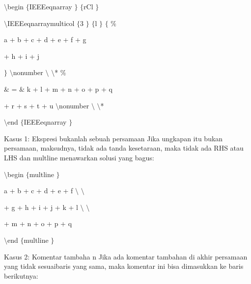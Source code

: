 \begin{itemize}
\vspace{12pt}
\noindent 
 $  \setminus  $begin $  \{  $IEEEeqnarray $  \}  $ $  \{  $rCl $  \}  $ \par
\vspace{12pt}
\noindent 
 $  \setminus  $IEEEeqnarraymulticol $  \{  $3 $  \}  $ $  \{  $l $  \}  $ $  \{  $ $  \%  $ \par
\vspace{12pt}
\noindent 
a + b + c + d + e + f + g \par
\vspace{12pt}
\noindent 
+ h + i + j \par
\vspace{12pt}
\noindent 
 $  \}  $ $  \setminus  $nonumber $  \setminus  $ $  \setminus  $* $  \%  $ \par
\vspace{12pt}
\noindent 
 $  \&  $ =  $  \&  $ k + l + m + n + o + p + q \par
\vspace{12pt}
\noindent 
+ r + s + t + u  $  \setminus  $nonumber $  \setminus  $ $  \setminus  $* \par
\vspace{12pt}
\noindent 
 $  \setminus  $end $  \{  $IEEEeqnarray $  \}  $ \par
\vspace{12pt}
\vspace{12pt}
\noindent 
Kasus 1: Ekspresi bukanlah sebuah persamaan Jika ungkapan itu bukan persamaan, maksudnya, tidak ada tanda kesetaraan, maka tidak ada RHS atau LHS dan multline menawarkan solusi yang bagus: \par
\vspace{12pt}
\noindent 
 $  \setminus  $begin $  \{  $multline $  \}  $ \par
\vspace{12pt}
\noindent 
a + b + c + d + e + f  $  \setminus  $ $  \setminus  $ \par
\vspace{12pt}
\noindent 
+ g + h + i + j + k + l  $  \setminus  $ $  \setminus  $ \par
\vspace{12pt}
\noindent 
+ m + n + o + p + q \par
\vspace{12pt}
\noindent 
 $  \setminus  $end $  \{  $multline $  \}  $ \par
\vspace{12pt}
\noindent 
Kasus 2: Komentar tambaha n Jika ada komentar tambahan di akhir persamaan yang tidak sesuaibaris yang sama, maka komentar ini bisa dimasukkan ke baris berikutnya: \par

\end{itemize}
